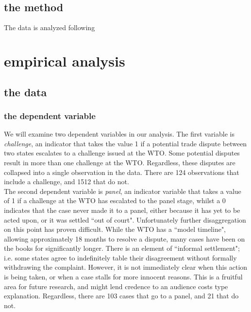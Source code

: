 \documentclass[]{article}
\begin{document}
\subsection{the method}
The data is analyzed following 

\section{empirical analysis}
\subsection{the data}
\subsubsection{the dependent variable}
We will examine two dependent variables in our analysis. The first variable is \textit{challenge}, an indicator that takes the value 1 if a potential trade dispute between two states escalates to a challenge issued at the WTO. Some potential disputes result in more than one challenge at the WTO. Regardless, these disputes are collapsed into a single observation in the data. There are 124 observations that include a challenge, and 1512 that do not.  \\

The second dependent variable is \textit{panel}, an indicator variable that takes a value of 1 if a challenge at the WTO has escalated to the panel stage, whilst a 0 indicates that the case never made it to a panel, either because it has yet to be acted upon, or it was settled ``out of court". Unfortunately further disaggregation on this point has proven difficult. While the WTO has a ``model timeline", allowing approximately 18 months to resolve a dispute,  many cases have been on the books for significantly longer. There is an element of ``informal settlement"; i.e. some states agree to indefinitely table their disagreement without formally withdrawing the complaint. However, it is not immediately clear when this action is being taken, or when a case stalls for more innocent reasons.  This is a fruitful area for future research,  and might lend credence to an audience costs type explanation. Regardless, there are 103 cases that go to a panel, and 21 that do not. 
\end{document}
